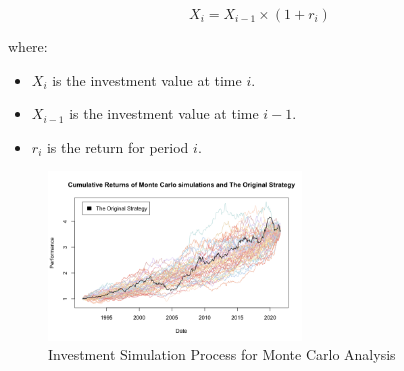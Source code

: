 \begin{equation}
X_i = X_{i-1} \times (1 + r_i)
\end{equation}

where:
\begin{itemize}
    \item $X_i$ is the investment value at time $i$.
    \item $X_{i-1}$ is the investment value at time $i-1$.
    \item $r_i$ is the return for period $i$.
\end{itemize}


\begin{figure}[h!]
    \centering
    \includegraphics[width=0.6\textwidth]{../Figures/investment_simulation_process.png}
    \caption{Investment Simulation Process for Monte Carlo Analysis}
    \label{fig:investment_simulation}
\end{figure}


\newpage
